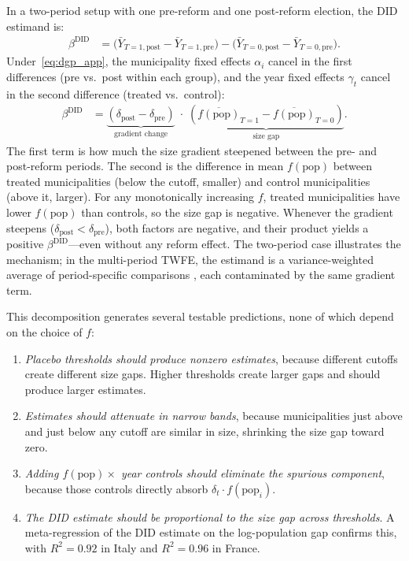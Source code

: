 \documentclass[12pt,letterpaper]{article}
\begin{document}
In a two-period setup with one pre-reform and one post-reform election, the DID estimand is:
%
\begin{align}
  \beta^{\text{DID}} &= \bigl(\bar{Y}_{T=1,\text{post}} - \bar{Y}_{T=1,\text{pre}}\bigr) - \bigl(\bar{Y}_{T=0,\text{post}} - \bar{Y}_{T=0,\text{pre}}\bigr). \label{eq:did_def}
\end{align}
%
Under~\eqref{eq:dgp_app}, the municipality fixed effects $\alpha_i$ cancel in the first differences (pre vs.\ post within each group), and the year fixed effects $\gamma_t$ cancel in the second difference (treated vs.\ control):
%
\begin{align}
  \beta^{\text{DID}} &= \underbrace{(\delta_{\text{post}} - \delta_{\text{pre}})}_{\text{gradient change}} \;\cdot\; \underbrace{(\overline{f(\text{pop})}_{T=1} - \overline{f(\text{pop})}_{T=0})}_{\text{size gap}}.
  \label{eq:decomp_app}
\end{align}
%
The first term is how much the size gradient steepened between the pre- and post-reform periods. The second is the difference in mean $f(\text{pop})$ between treated municipalities (below the cutoff, smaller) and control municipalities (above it, larger). For any monotonically increasing $f$, treated municipalities have lower $f(\text{pop})$ than controls, so the size gap is negative. Whenever the gradient steepens ($\delta_{\text{post}} < \delta_{\text{pre}}$), both factors are negative, and their product yields a positive $\beta^{\text{DID}}$---even without any reform effect. The two-period case illustrates the mechanism; in the multi-period TWFE, the estimand is a variance-weighted average of period-specific comparisons \citep{goodmanbacon2021}, each contaminated by the same gradient term.

This decomposition generates several testable predictions, none of which depend on the choice of $f$:
\begin{enumerate}
  \item \textit{Placebo thresholds should produce nonzero estimates}, because different cutoffs create different size gaps. Higher thresholds create larger gaps and should produce larger estimates.
  \item \textit{Estimates should attenuate in narrow bands}, because municipalities just above and just below any cutoff are similar in size, shrinking the size gap toward zero.
  \item \textit{Adding $f(\text{pop}) \times$ year controls should eliminate the spurious component}, because those controls directly absorb $\delta_t \cdot f(\text{pop}_i)$.
  \item \textit{The DID estimate should be proportional to the size gap across thresholds}. A meta-regression of the DID estimate on the log-population gap confirms this, with $R^2 = 0.92$ in Italy and $R^2 = 0.96$ in France.
\end{enumerate}
\end{document}
